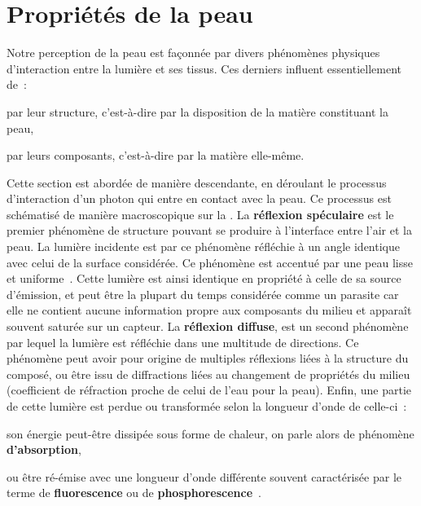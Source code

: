 \section{Propriétés de la peau}
Notre perception de la peau est façonnée par divers phénomènes physiques d'interaction entre la lumière et ses tissus. Ces derniers influent essentiellement de~: 
\begin{inlinerate}
    \item par leur structure, c’est-à-dire par la disposition de la matière constituant la peau,
    \item par leurs composants, c’est-à-dire par la matière elle-même.
\end{inlinerate}
Cette section est abordée de manière descendante, en déroulant le processus d'interaction d'un photon qui entre en contact avec la peau. Ce processus est schématisé de manière macroscopique sur la . La \textbf{réflexion spéculaire} est le premier phénomène de structure pouvant se produire à l'interface entre l'air et la peau. La lumière incidente est par ce phénomène réfléchie à un angle identique avec celui de la surface considérée. Ce phénomène est accentué par une peau lisse et uniforme~\cite{Yang2009}. Cette lumière est ainsi identique en propriété à celle de sa source d'émission, et peut être la plupart du temps considérée comme un parasite car elle ne contient aucune information propre aux composants du milieu et apparaît souvent saturée sur un capteur. La \textbf{réflexion diffuse}, est un second phénomène par lequel la lumière est réfléchie dans une multitude de directions. Ce phénomène peut avoir pour origine de multiples réflexions liées à la structure du composé, ou être issu de diffractions liées au changement de propriétés du milieu~\cite{Yang2009} (coefficient de réfraction proche de celui de l'eau pour la peau). Enfin, une partie de cette lumière est perdue ou transformée selon la longueur d'onde de celle-ci~:
\begin{inlinerate}
    \item son énergie peut-être dissipée sous forme de chaleur, on parle alors de phénomène \textbf{d'absorption},
    \item ou être ré-émise avec une longueur d'onde différente souvent caractérisée par le terme de \textbf{fluorescence} ou de \textbf{phosphorescence}~\cite{Kollias2002}.
\end{inlinerate}\par

